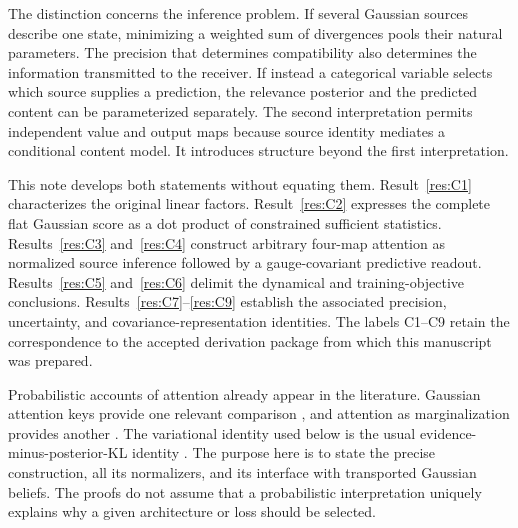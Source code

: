 \documentclass[11pt]{article}
\begin{document}
The distinction concerns the inference problem. If several Gaussian sources describe one state, minimizing a weighted sum of divergences pools their natural parameters. The precision that determines compatibility also determines the information transmitted to the receiver. If instead a categorical variable selects which source supplies a prediction, the relevance posterior and the predicted content can be parameterized separately. The second interpretation permits independent value and output maps because source identity mediates a conditional content model. It introduces structure beyond the first interpretation.

This note develops both statements without equating them. Result~\ref{res:C1} characterizes the original linear factors. Result~\ref{res:C2} expresses the complete flat Gaussian score as a dot product of constrained sufficient statistics. Results~\ref{res:C3} and~\ref{res:C4} construct arbitrary four-map attention as normalized source inference followed by a gauge-covariant predictive readout. Results~\ref{res:C5} and~\ref{res:C6} delimit the dynamical and training-objective conclusions. Results~\ref{res:C7}--\ref{res:C9} establish the associated precision, uncertainty, and covariance-representation identities. The labels C1--C9 retain the correspondence to the accepted derivation package from which this manuscript was prepared.

Probabilistic accounts of attention already appear in the literature. Gaussian attention keys provide one relevant comparison \citep{Nguyen2022}, and attention as marginalization provides another \citep{SinghBuckley2023}. The variational identity used below is the usual evidence-minus-posterior-KL identity \citep{Blei2017}. The purpose here is to state the precise construction, all its normalizers, and its interface with transported Gaussian beliefs. The proofs do not assume that a probabilistic interpretation uniquely explains why a given architecture or loss should be selected.
\end{document}
